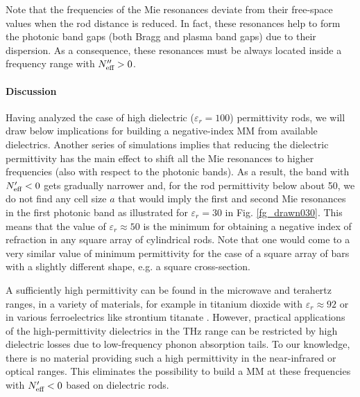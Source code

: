 Note that the frequencies of the Mie resonances deviate from their free-space values when the rod distance is reduced. In fact, these resonances help to form the photonic band gaps (both Bragg and plasma band gaps) due to their dispersion. As a consequence, these resonances must be always located inside a frequency range with $N_{\text{eff} }''>0$.
\paragraph{Discussion}%
Having analyzed the case of high dielectric ($\varepsilon_r=100$) permittivity rods, we will draw below implications for building a negative-index MM from available dielectrics.  Another series of simulations implies that reducing the dielectric permittivity has the main effect to shift all the Mie resonances to higher frequencies (also with respect to the photonic bands). As a result, the band with $N_{\text{eff} }'<0$ gets gradually narrower and, for the rod permittivity below about 50, we do not find any cell size $a$ that would imply the first and second Mie resonances in the first photonic band as illustrated for $\varepsilon_r = 30$ in Fig. \ref{fg_drawn030}. This means that the value of $\varepsilon_{r} \approx 50$ is the minimum for obtaining a negative index of refraction in any square array of cylindrical rods. Note that one would come to a very similar value of minimum permittivity for the case of a square array of bars with a slightly different shape, e.g. a square cross-section. 

A sufficiently high permittivity can be found in the microwave and terahertz ranges, in a variety of materials, for example in titanium dioxide with $\varepsilon_r \approx 92$ \cite{nemec2009tunable} or in various ferroelectrics like strontium titanate \cite{skoromets2011tuning}. However, practical applications of the high-permittivity dielectrics in the THz range can be restricted by high dielectric losses due to low-frequency phonon absorption tails. To our knowledge, there is no material providing such a high permittivity in the near-infrared or optical ranges. This eliminates the possibility to build a MM at these frequencies with $N_{\text{eff} }'<0$ based on dielectric rods.

